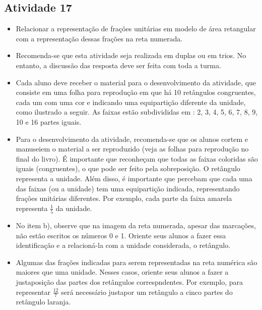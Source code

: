 \begin{multicols}{2}
\subsection{Atividade 17}

\begin{itemize} %
    \item       Relacionar a representação de frações unitárias em modelo de área retangular com a representação dessas frações na reta numerada. 
\end{itemize} %
    
\begin{itemize} %
    \item       Recomenda-se que esta atividade seja realizada em duplas ou em trios. No entanto, a discussão das resposta deve ser feita com toda a turma.
    \item       Cada aluno deve receber o material para o desenvolvimento da atividade, que consiste em uma folha para reprodução em que há 10 retângulos congruentes, cada um com uma cor e indicando uma equipartição diferente da unidade, como ilustrado a seguir. As faixas estão subdivididas em : 2, 3, 4, 5, 6, 7, 8, 9, 10 e 16 partes iguais. 
    \item       Para o desenvolvimento da atividade, recomenda-se que os alunos cortem e manuseiem o material a ser reproduzido (veja as folhas para reprodução no final do livro). É importante que reconheçam que todas as faixas coloridas são iguais (congruentes), o que pode ser feito pela sobreposição. O retângulo representa a unidade. Além disso, é importante que percebam que cada uma das faixas (ou a unidade) tem uma equipartição indicada, representando frações unitárias diferentes. Por exemplo, cada parte da faixa amarela representa       $\frac{1}{5}$       da unidade.
    \item       No item b), observe que na imagem da reta numerada, apesar das marcações, não estão escritos os números 0 e 1. Oriente seus alunos a fazer essa identificação e a relacioná-la com a unidade considerada, o retângulo.
    \item       Algumas das frações indicadas para serem representadas na reta numérica são maiores que uma unidade. Nesses casos, oriente seus alunos a fazer a justaposição das partes dos retângulos correspndentes. Por exemplo, para representar       $\frac{12}{7}$       será necessário justapor um retângulo a cinco partes do retângulo laranja.
\end{itemize} %


\end{multicols}
